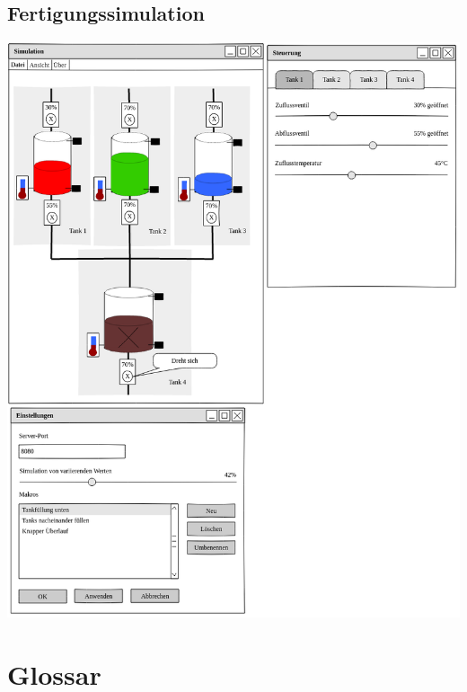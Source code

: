 \documentclass[parskip=full]{scrartcl}
\begin{document}
\subsection{Fertigungssimulation}
\includegraphics[scale=0.5]{media/ui-sketch-server.png}

\section{Glossar}
\Blindtext[1]
\end{document}
